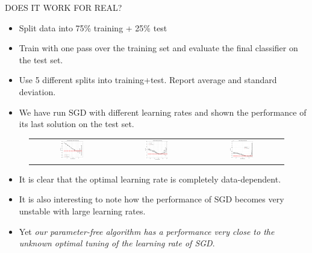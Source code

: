\documentclass[final,t,serif,mathserif]{beamer}
\begin{document}
\begin{frame}{}
\begin{columns}[t]
\begin{column}{.33\linewidth}
\begin{block}{DOES IT WORK FOR REAL?}
      \begin{itemize}
        \item Split data into 75\% training + 25\% test
        \item Train with one pass over the training set and evaluate the final classifier on the test set.
        \item Use 5 different splits into training+test. Report average and standard deviation.
        \item We have run SGD with different learning rates and shown the performance of its last solution on the test set.
       \end{itemize}
      \begin{figure}[t]
	\centering
	\begin{tabular}{ccc}
	\includegraphics[width=0.3\textwidth]{../figs/yearPredictionMSD_kt_train_test-crop.pdf} &
        \includegraphics[width=0.3\textwidth]{../figs/cpusmall_kt_train_test-crop.pdf} &
        \includegraphics[width=0.3\textwidth]{../figs/cadata_kt_train_test-crop.pdf}
	\end{tabular}
      \end{figure}
      \begin{itemize}
        \item It is clear that the optimal learning rate is completely data-dependent.
        \item It is also interesting to note how the performance of SGD becomes very unstable with large learning rates. \item Yet \emph{our parameter-free algorithm has a performance very close to the unknown optimal tuning of the learning rate of SGD}.
       \end{itemize}
       

\end{block}
\end{column}
\end{columns}
\end{frame}
\end{document}
